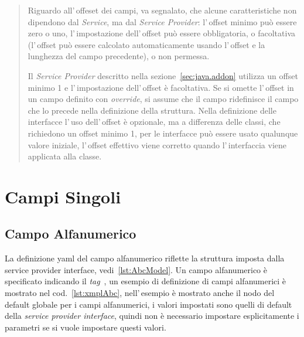 \begin{quote}
Riguardo all'\,offeset dei campi, va segnalato, che alcune caratteristiche non 
dipendono dal \textsl{Service}, ma dal \textsl{Service Provider}:
l'\,offset minimo può essere zero o uno, l'\,impostazione dell'\,offset può
essere obbligatoria, o facoltativa (l'\,offset può essere calcolato 
automaticamente usando l'\,offset e la lunghezza del campo precedente), 
o non permessa.

Il \textsl{Service Provider} descritto nella sezione~\ref{sec:java.addon}
utilizza un offset minimo 1 e l'\,impostazione dell'\,offset è facoltativa.
Se si omette l'\,offset in un campo definito con \textsl{override}, si assume 
che  il campo ridefinisce il campo che lo precede nella definizione della 
struttura.
Nella definizione delle interfacce l'\,uso dell'\,offset è opzionale, ma a 
differenza delle classi, che richiedono un offset minimo 1, per le interfacce
può essere usato qualunque valore iniziale, l'\,offset effettivo viene corretto
quando l'\,interfaccia viene applicata alla classe.
\end{quote}


\section{Campi Singoli}

\subsection{Campo Alfanumerico} \label{sub:yaml.abc}
La definizione yaml del campo alfanumerico riflette la struttura imposta dalla
service provider interface, vedi~\ref{lst:AbcModel}.
Un campo alfanumerico è specificato indicando il \textsl{tag} 
\,, 
un esempio di definizione di campi alfanumerici è mostrato nel 
cod.~\ref{lst:xmplAbc}, nell'\,esempio è mostrato anche il nodo del default
globale per i campi alfanumerici, i valori impostati sono quelli di default
della \textsl{service provider interface}, quindi non è necessario impostare
esplicitamente i parametri se si vuole impostare questi valori.

